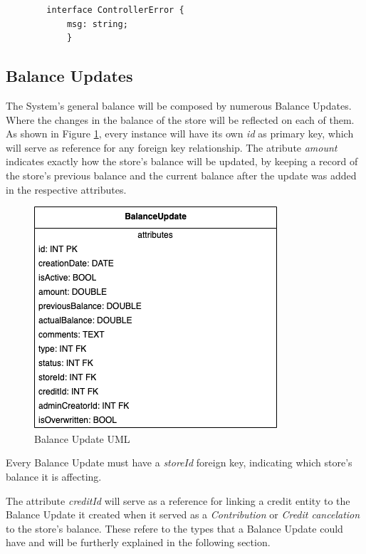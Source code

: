     \begin{verbatim}
        interface ControllerError {
            msg: string;
            }
    \end{verbatim}
                

    \subsection{Balance Updates}

The System's general balance will be composed by numerous Balance Updates. Where the changes in the balance of the store will be reflected on each of them. As shown in Figure \ref{fig:uml_balance_update}, every instance will have its own \textit{id} as primary key, which will serve as reference for any foreign key relationship. The atribute \textit{amount} indicates exactly how the store's balance will be updated, by keeping a record of the store's previous balance and the current balance after the update was added in the respective attributes.

\begin{figure} [H]
    \centering
    \includegraphics[scale = 0.7]{assets/uml/BalanceUpdate.png}
    \caption{Balance Update UML}\label{fig:uml_balance_update}
\end{figure}

Every Balance Update must have a \textit{storeId} foreign key, indicating which store's balance it is affecting. 

The attribute \textit{creditId} will serve as a reference for linking a credit entity to the Balance Update it created when it served as a \textit{Contribution} or \textit{Credit cancelation} to the store's balance. These refere to the types that a Balance Update could have and will be furtherly explained in the following section. 

